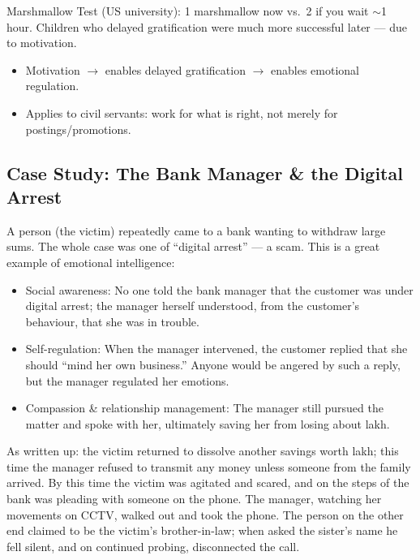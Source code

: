 \begin{DataFact}
Marshmallow Test (US university): 1 marshmallow now vs.\ 2 if you wait $\sim$1 hour. Children who delayed gratification were much more successful later --- due to motivation.
\end{DataFact}

\begin{KeyConcept}
\begin{itemize}
\item Motivation $\rightarrow$ enables delayed gratification $\rightarrow$ enables emotional regulation.
\item Applies to civil servants: work for what is right, not merely for postings/promotions.
\end{itemize}
\end{KeyConcept}

\subsection{Case Study: The Bank Manager \& the Digital Arrest}

A person (the victim) repeatedly came to a bank wanting to withdraw large sums. The whole case was one of ``digital arrest'' --- a scam. This is a great example of emotional intelligence:

\begin{itemize}
\item Social awareness: No one told the bank manager that the customer was under digital arrest; the manager herself understood, from the customer's behaviour, that she was in trouble.
\item Self-regulation: When the manager intervened, the customer replied that she should ``mind her own business.'' Anyone would be angered by such a reply, but the manager regulated her emotions.
\item Compassion \& relationship management: The manager still pursued the matter and spoke with her, ultimately saving her from losing about  lakh.
\end{itemize}

As written up: the victim returned to dissolve another savings worth  lakh; this time the manager refused to transmit any money unless someone from the family arrived. By this time the victim was agitated and scared, and on the steps of the bank was pleading with someone on the phone. The manager, watching her movements on CCTV, walked out and took the phone. The person on the other end claimed to be the victim's brother-in-law; when asked the sister's name he fell silent, and on continued probing, disconnected the call.

